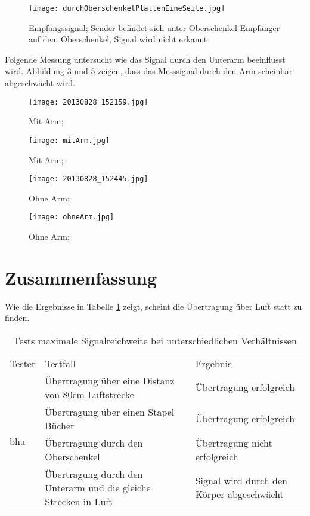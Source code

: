 \documentclass[10pt]{scrartcl}
\begin{document}
\begin{figure}[h!]
	\centering
	\texttt{[image: durchOberschenkelPlattenEineSeite.jpg]}
	\caption{Empfangssignal; Sender befindet sich unter Oberschenkel Empfänger auf dem Oberschenkel, Signal wird nicht erkannt}
	\label{img:EmpfangssignalOberschenkelPlattenEinerSeite}
\end{figure}

\clearpage
Folgende Messung untersucht wie das Signal durch den Unterarm beeinflusst wird. Abbildung \ref{img:MitArmMesssignal} und \ref{img:OhneArmMesssignal} zeigen, dass das Messsignal durch den Arm scheinbar abgeschwächt wird. 
\begin{figure}[h!]
	\centering
	\texttt{[image: 20130828\_152159.jpg]}
	\caption{Mit Arm; }
	\label{img:MitArm}
\end{figure}

\begin{figure}[h!]
	\centering
	\texttt{[image: mitArm.jpg]}
	\caption{Mit Arm; }
	\label{img:MitArmMesssignal}
\end{figure}

\begin{figure}[h!]
	\centering
	\texttt{[image: 20130828\_152445.jpg]}
	\caption{Ohne Arm; }
	\label{img:OhneArm}
\end{figure}

\begin{figure}[h!]
	\centering
	\texttt{[image: ohneArm.jpg]}
	\caption{Ohne Arm; }
	\label{img:OhneArmMesssignal}
\end{figure}

\clearpage
\newpage
\part{Zusammenfassung}
Wie die Ergebnisse in Tabelle \ref{tab:TabelleMessergebnisse} zeigt, scheint die Übertragung über Luft statt zu finden. 
\begin{table}[h!]
\caption{Tests maximale Signalreichweite bei unterschiedlichen Verhältnissen}

\begin{small}
\begin{tabular}[h!] { p{1cm} p{6cm} p{5cm} }
\toprule
Tester & Testfall & Ergebnis\\ \cmidrule(r){1-3}
\multirow{8}{*}{bhu} 
& Übertragung über eine Distanz von 80cm Luftstrecke & Übertragung erfolgreich \\ 
\cmidrule(r){2-3}
& Übertragung über einen Stapel Bücher & Übertragung erfolgreich \\ 
\cmidrule(r){2-3}
& Übertragung durch den Oberschenkel & Übertragung nicht erfolgreich \\ 
\cmidrule(r){2-3}
& Übertragung durch den Unterarm und die gleiche Strecken in Luft & Signal wird durch den Körper abgeschwächt \\ 

 \bottomrule

\end{tabular}
\end{small}

\label{tab:TabelleMessergebnisse}
\end{table}
\end{document}
